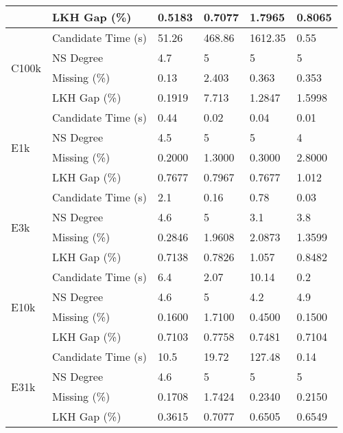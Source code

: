\begin{longtable}[c]{llllll}
                & LKH Gap (\%)           & 0.5183 & 0.7077 & 1.7965  & 0.8065 \\
    \midrule
    \multirow{4}[2]{*}{C100k}  & Candidate Time (s) & 51.26 & 468.86 & 1612.35 & 0.55 \\
                & NS Degree       & 4.7    & 5    & 5       & 5      \\
                & Missing (\%)               & 0.13  & 2.403 & 0.363 & 0.353 \\
                & LKH Gap (\%)           & 0.1919 & 7.713 & 1.2847  & 1.5998 \\
    \midrule
    \multirow{4}[2]{*}{E1k}    & Candidate Time (s) & 0.44   & 0.02   & 0.04    & 0.01   \\
                & NS Degree       & 4.5    & 5    & 5       & 4      \\
                & Missing (\%)               & 0.2000  & 1.3000 & 0.3000  & 2.8000  \\
                & LKH Gap (\%)           & 0.7677 & 0.7967 & 0.7677  & 1.012  \\
    \midrule
    \multirow{4}[2]{*}{E3k}    & Candidate Time (s) & 2.1   & 0.16   & 0.78   & 0.03  \\
                & NS Degree       & 4.6    & 5    & 3.1     & 3.8    \\
                & Missing (\%)               & 0.2846  & 1.9608 & 2.0873  & 1.3599  \\
                & LKH Gap (\%)           & 0.7138 & 0.7826 & 1.057   & 0.8482 \\
    \midrule
    \multirow{4}[2]{*}{E10k}   & Candidate Time (s) & 6.4  & 2.07  & 10.14   & 0.2  \\
                & NS Degree       & 4.6    & 5    & 4.2     & 4.9    \\
                & Missing (\%)               & 0.1600  & 1.7100 & 0.4500  & 0.1500  \\
                & LKH Gap (\%)           & 0.7103 & 0.7758 & 0.7481  & 0.7104 \\
    \midrule
    \multirow{4}[2]{*}{E31k}   & Candidate Time (s) & 10.5 & 19.72  & 127.48  & 0.14  \\
                & NS Degree       & 4.6    & 5    & 5       & 5      \\
                & Missing (\%)              & 0.1708  & 1.7424 & 0.2340  & 0.2150  \\
                & LKH Gap (\%)           & 0.3615 & 0.7077 & 0.6505  & 0.6549 \\

\end{longtable}
